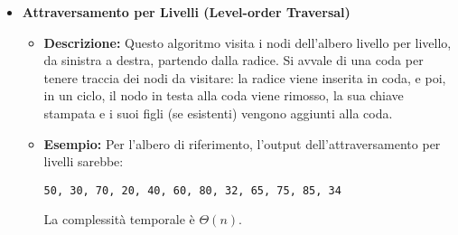 \begin{itemize}
    \item \textbf{Attraversamento per Livelli (Level-order Traversal)}
    \begin{itemize}
        \item \textbf{Descrizione:} Questo algoritmo visita i nodi dell'albero livello per livello, da sinistra a destra, partendo dalla radice. Si avvale di una coda per tenere traccia dei nodi da visitare: la radice viene inserita in coda, e poi, in un ciclo, il nodo in testa alla coda viene rimosso, la sua chiave stampata e i suoi figli (se esistenti) vengono aggiunti alla coda.

        \item \textbf{Esempio:} Per l'albero di riferimento, l'output dell'attraversamento per livelli sarebbe:
        \begin{verbatim}
50, 30, 70, 20, 40, 60, 80, 32, 65, 75, 85, 34
        \end{verbatim}
        La complessità temporale è $\Theta(n)$.
    \end{itemize}
\end{itemize}
